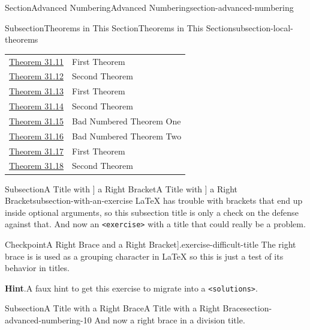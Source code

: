 \documentclass[twoside,10pt,]{article}
\newcommand{\blocktitlefont}{\relax}
\newcommand{\mono}[1]{\texttt{#1}}
\numberwithin{equation}{section}
\begin{document}
\begin{sectionptx}{Section}{Advanced Numbering}{}{Advanced Numbering}{}{}{section-advanced-numbering}
\begin{subsectionptx}{Subsection}{Theorems in This Section}{}{Theorems in This Section}{}{}{subsection-local-theorems}
\begin{longtable}[l]{ll}
\hyperref[theorem-number-09]{Theorem 31.11}& First Theorem\\
\hyperref[theorem-number-10]{Theorem 31.12}& Second Theorem\\
\hyperref[theorem-number-11]{Theorem 31.13}& First Theorem\\
\hyperref[theorem-number-12]{Theorem 31.14}& Second Theorem\\
\hyperref[theorem-bad-one]{Theorem 31.15}& Bad Numbered Theorem One\\
\hyperref[theorem-bad-two]{Theorem 31.16}& Bad Numbered Theorem Two\\
\hyperref[theorem-number-13]{Theorem 31.17}& First Theorem\\
\hyperref[theorem-number-14]{Theorem 31.18}& Second Theorem\\
\end{longtable}
\end{subsectionptx}
%
%
\typeout{************************************************}
\typeout{Subsection 31.7 A Title with ] a Right Bracket}
\typeout{************************************************}
%
\begin{subsectionptx}{Subsection}{A Title with ] a Right Bracket}{}{A Title with ] a Right Bracket}{}{}{subsection-with-an-exercise}
\LaTeX{} has trouble with brackets that end up inside optional arguments, so this subsection title is only a check on the defense against that.  And now an \mono{<exercise>} with a title that could really be a problem.%
\begin{inlineexercise}{Checkpoint}{A Right Brace \textbraceright{} and a Right Bracket].}{exercise-difficult-title}%
The right brace is is used as a grouping character in \LaTeX{} so this is just a test of its behavior in titles.%
\par\smallskip%
\noindent\textbf{\blocktitlefont Hint}.\hypertarget{exercise-difficult-title-3}{}\quad{}A faux hint to get this exercise to migrate into a \mono{<solutions>}.%
\end{inlineexercise}%
\end{subsectionptx}
%
%
\typeout{************************************************}
\typeout{************************************************}
%
\begin{subsectionptx}{Subsection}{A Title with \textbraceright{} a Right Brace}{}{A Title with \textbraceright{} a Right Brace}{}{}{section-advanced-numbering-10}
And now a right brace in a division title.%
\end{subsectionptx}

\end{sectionptx}
\end{document}
